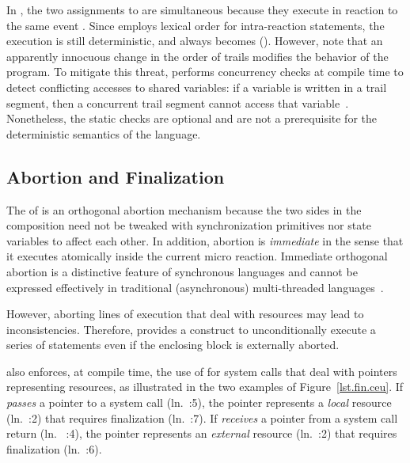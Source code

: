 In \bx, the two assignments to  are simultaneous because
they execute in reaction to the same event .
Since \CEU employs lexical order for intra-reaction statements, the execution
is still deterministic, and  always becomes  ().
%
However, note that an apparently innocuous change in the order of trails
modifies the behavior of the program.
%
To mitigate this threat, \CEU performs concurrency checks at compile time to
detect conflicting accesses to shared variables:
if a variable is written in a trail segment, then a concurrent trail segment
cannot access that variable~\cite{ceu.sensys13}.
%
Nonetheless, the static checks are optional and are not a prerequisite for the
deterministic semantics of the language.

\subsection{Abortion and Finalization}
\label{sec.ceu.fin}

The  of \CEU is an orthogonal abortion mechanism because the two
sides in the composition need not be tweaked with synchronization primitives nor
state variables to affect each other.
%
In addition, abortion is \emph{immediate} in the sense that it executes
atomically inside the current micro reaction.
%
Immediate orthogonal abortion is a distinctive feature of synchronous languages
and cannot be expressed effectively in traditional (asynchronous)
multi-threaded languages~\cite{esterel.preemption,sync_async.threadsstop}.

However, aborting lines of execution that deal with resources may lead to
inconsistencies.
%
Therefore, \CEU provides a  construct to unconditionally
execute a series of statements even if the enclosing block is externally
aborted.

\CEU also enforces, at compile time, the use of  for system
calls that deal with pointers representing resources, as illustrated in the two
examples of Figure~\ref{lst.fin.ceu}.
%
 If \CEU \emph{passes} a pointer to a system call (ln.~\ax:5), the
          pointer represents a \emph{local} resource (ln.~\ax:2) that
          requires finalization (ln.~\ax:7).
 If \CEU \emph{receives} a pointer from a system call return
          (ln.~ \bx:4), the pointer represents an \emph{external} resource
          (ln.~\bx:2) that requires finalization (ln.~\bx:6).

